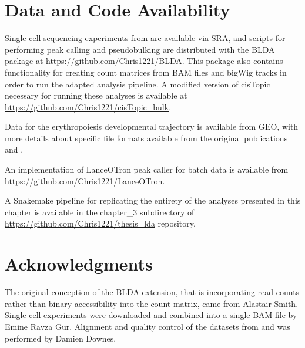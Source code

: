 \section{Data and Code Availability}

Single cell sequencing experiments from \cite{Buenrostro2015} are available via SRA, and scripts for performing peak calling and pseudobulking are distributed with the BLDA package at \url{https://github.com/Chris1221/BLDA}. This package also contains functionality for creating count matrices from BAM files and bigWig tracks in order to run the adapted analysis pipeline. A modified version of cisTopic necessary for running these analyses is available at \url{https://github.com/Chris1221/cisTopic_bulk}. 

Data for the erythropoiesis developmental trajectory is available from GEO, with more details about specific file formats available from the original publications \textcite{Corces2016} and \textcite{Ludwig2019}.

An implementation of LanceOTron peak caller for batch data is available from \url{https://github.com/Chris1221/LanceOTron}.

A Snakemake pipeline for replicating the entirety of the analyses presented in this chapter is available in the chapter\_3 subdirectory of \url{https://github.com/Chris1221/thesis_lda} repository.

\section{Acknowledgments}

The original conception of the BLDA extension, that is incorporating read counts rather than binary accessibility into the count matrix, came from Alastair Smith. Single cell experiments were downloaded and combined into a single BAM file by Emine Ravza Gur. Alignment and quality control of the datasets from \textcite{Corces2016} and \textcite{Ludwig2019} was performed by Damien Downes. 